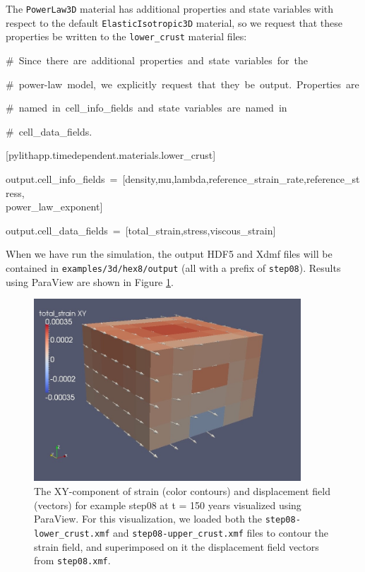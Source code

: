 The \texttt{PowerLaw3D} material has additional properties and state
variables with respect to the default \texttt{ElasticIsotropic3D}
material, so we request that these properties be written to the \texttt{lower\_crust}
material files:
\begin{lyxcode}
\#~Since~there~are~additional~properties~and~state~variables~for~the

\#~power-law~model,~we~explicitly~request~that~they~be~output.~Properties~are

\#~named~in~cell\_info\_fields~and~state~variables~are~named~in

\#~cell\_data\_fields.

{[}pylithapp.timedependent.materials.lower\_crust{]}

output.cell\_info\_fields~=~{[}density,mu,lambda,reference\_strain\_rate,reference\_stress,~\\
power\_law\_exponent{]}

output.cell\_data\_fields~=~{[}total\_strain,stress,viscous\_strain{]}
\end{lyxcode}
When we have run the simulation, the output HDF5 and Xdmf files will
be contained in \texttt{examples/3d/hex8/output} (all with a prefix
of \texttt{step08}). Results using ParaView are shown in Figure \ref{fig:step08-strain-displ-t150}.
\begin{figure}
\centering{}\includegraphics[width=10cm]{tutorials/3dhex8/figs/step08-strain-displ-t150}\caption{The XY-component of strain (color contours) and displacement field
(vectors) for example step08 at t = 150 years visualized using ParaView.
For this visualization, we loaded both the \texttt{step08-lower\_crust.xmf}
and \texttt{step08-upper\_crust.xmf} files to contour the strain field,
and superimposed on it the displacement field vectors from \texttt{step08.xmf}.\label{fig:step08-strain-displ-t150}}
\end{figure}



